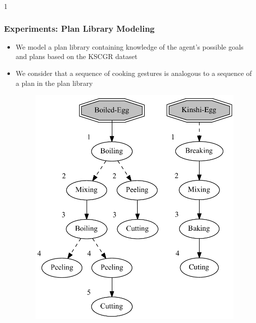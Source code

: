 \documentclass{beamer}
\def\masterclass{1}
\begin{document}
\if\masterclass1
\begin{frame}[c]\frametitle{Experiments: Plan Library Modeling}
   	\begin{itemize}
		\item We model a plan library containing knowledge of the agent's possible goals and plans based on the KSCGR dataset
		\item We consider that a sequence of cooking gestures is analogous to a sequence of a plan in the plan library
		\begin{figure}[here]
			\centering
			\includegraphics[width=0.4\linewidth]{fig/boiledegg-kinshiegg.pdf}
		\end{figure}
	\end{itemize}
\end{frame}
\end{document}
